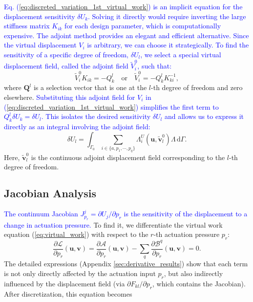 \documentclass[journal]{IEEEtran}
\theoremstyle{definition}
\begin{document}
\textcolor{blue}{Eq. (\ref{eq:discreted_variation_1st_virtual_work}) is an implicit equation for the displacement sensitivity $\delta U_k$. Solving it directly would require inverting the large stiffness matrix $K_{ik}$ for each design parameter, which is computationally expensive. The adjoint method provides an elegant and efficient alternative. Since the virtual displacement $V_i$ is arbitrary, we can choose it strategically. To find the sensitivity of a specific degree of freedom, $\delta U_l$, we select a special virtual displacement field, called the adjoint field $\tilde{V}^0_i$, such that:}
\begin{equation}
  \tilde{V}^0_i K_{ik}  = -Q^l_k \quad \text{or} \quad \tilde{V}^0_i = -Q^l_k K^{-1}_{ki} ,
  \label{eq:adjoint_1st}
\end{equation}
where $\mathbf{Q}^l$ is a selection vector that is one at the $l$-th degree of freedom and zero elsewhere. \textcolor{blue}{Substituting this adjoint field for $V_i$ in (\ref{eq:discreted_variation_1st_virtual_work}) simplifies the first term to $Q^l_k \delta U_k = \delta U_l$. This isolates the desired sensitivity $\delta U_l$ and allows us to express it directly as an integral involving the adjoint field:}
\begin{equation}
  \delta U_l = \int_{\Gamma_0} \sum_{i\in\{a,p_1,\cdots,p_q\}} \Lambda_i^U\left(\mathbf{u},\tilde{\mathbf{v}}^0_l\right) \Lambda \,\mathrm{d}\Gamma.
  \label{eq:displacement_shape_derivative}
\end{equation}
Here, $\tilde{\mathbf{v}}^0_l$ is the continuous adjoint displacement field corresponding to the $l$-th degree of freedom.

\subsection{Jacobian Analysis}

\textcolor{blue}{The continuum Jacobian $J^j_{p_r} = \partial U_j / \partial p_r$ is the sensitivity of the displacement to a change in actuation pressure.} To find it, we differentiate the virtual work equation (\ref{eq:virtual_work}) with respect to the $r$-th actuation pressure $p_r$:
\begin{equation}
  \frac{\partial \mathcal{L}}{\partial p_r}(\mathbf{u}, \mathbf{v}) = \frac{\partial \mathcal{A}}{\partial p_r}(\mathbf{u}, \mathbf{v}) - \sum_q \frac{\partial \mathcal{B}^q}{\partial p_r}(\mathbf{u}, \mathbf{v}) = 0.
  \label{eq:first_derivative}
\end{equation}
The detailed expressions (Appendix \ref{sec:derivative_results}) show that each term is not only directly affected by the actuation input $p_r$, but also indirectly influenced by the displacement field (via $\partial F_{kl}/\partial p_r$, which contains the Jacobian). After discretization, this equation becomes
\end{document}
